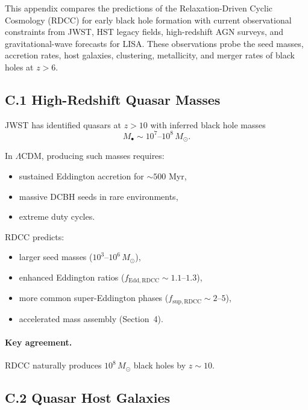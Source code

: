 \documentclass[11pt,a4paper]{article}
\begin{document}
This appendix compares the predictions of the Relaxation-Driven Cyclic Cosmology (RDCC) for 
early black hole formation with current observational constraints from JWST, HST legacy 
fields, high-redshift AGN surveys, and gravitational-wave forecasts for LISA. These 
observations probe the seed masses, accretion rates, host galaxies, clustering, metallicity, 
and merger rates of black holes at $z > 6$.

\subsection*{C.1 High-Redshift Quasar Masses}

JWST has identified quasars at $z > 10$ with inferred black hole masses
\begin{equation}
    M_{\bullet} \sim 10^{7}\text{--}10^{8}\,M_{\odot}.
\end{equation}

In $\Lambda$CDM, producing such masses requires:

\begin{itemize}
    \item sustained Eddington accretion for $\sim 500$ Myr,
    \item massive DCBH seeds in rare environments,
    \item extreme duty cycles.
\end{itemize}

RDCC predicts:

\begin{itemize}
    \item larger seed masses ($10^{3}$–$10^{6}\,M_{\odot}$),
    \item enhanced Eddington ratios ($f_{\mathrm{Edd,RDCC}} \sim 1.1$–$1.3$),
    \item more common super-Eddington phases ($f_{\mathrm{sup,RDCC}} \sim 2$–$5$),
    \item accelerated mass assembly (Section~4).
\end{itemize}

\paragraph{Key agreement.}
RDCC naturally produces $10^{8}\,M_{\odot}$ black holes by $z \sim 10$.

\subsection*{C.2 Quasar Host Galaxies}
\end{document}

